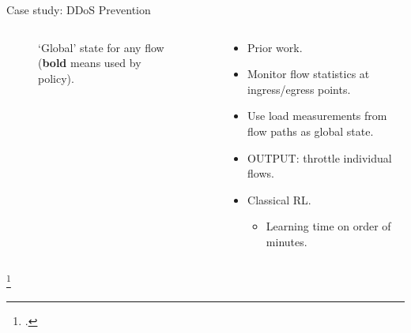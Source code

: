 \documentclass[aspectratio=169,xcolor={dvipsnames}
]{beamer}
\begin{document}
\begin{frame}{Case study: DDoS Prevention}
\begin{columns}
\begin{column}{0.4\linewidth}
\begin{figure}
{\begin{tikzpicture}
					\end{tikzpicture}
				}
			\caption{`Global' state for any flow (\textbf{bold} means used by policy).}
			\end{figure}
		\end{column}
		\begin{column}{0.6\linewidth}
			\begin{itemize}
				\item Prior work\footnotemark.
				\item Monitor flow statistics at ingress/egress points.
				\item Use load measurements from flow paths as global state.
				\item OUTPUT: throttle individual flows.
				\item Classical RL.
				\begin{itemize}
					\item Learning time on order of minutes.
				\end{itemize}
			\end{itemize}
		\end{column}
	\end{columns}
\footcitetext{DBLP:journals/tnsm/SimpsonRP20}
\end{frame}
\end{document}
